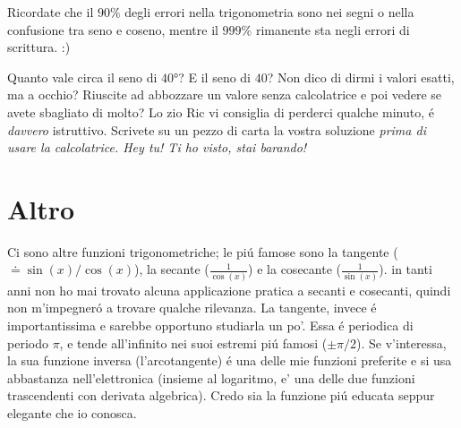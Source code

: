 Ricordate che il $90\%$ degli errori nella trigonometria sono nei segni o nella confusione tra seno e coseno, mentre il $999\%$ rimanente sta negli errori di scrittura. :)

\begin{esercizio}
Quanto vale circa il seno di $\ang{40}$? E il seno di $40$? Non dico di dirmi i valori esatti, ma a occhio? Riuscite ad abbozzare un valore senza calcolatrice
e poi vedere se avete sbagliato di molto? Lo zio Ric vi consiglia di perderci qualche minuto, \'e {\em davvero} istruttivo. Scrivete su un pezzo di carta
la vostra soluzione \em{prima} di usare la calcolatrice. \em{Hey tu! Ti ho visto, stai barando!}
\end{esercizio}


\section{Altro}

Ci sono altre funzioni trigonometriche; le pi\'u famose sono la tangente ($\doteq \sin(x)/\cos(x)$),
la secante ($\frac{1}{\cos(x)}$) e la cosecante ($\frac{1}{\sin(x)}$). in tanti anni non ho mai trovato alcuna applicazione
pratica a secanti e cosecanti, quindi non m'impegner\'o a trovare qualche rilevanza.
La tangente, invece \'e importantissima e sarebbe opportuno studiarla un po'. Essa \'e periodica di periodo $\pi$, e
tende all'infinito nei suoi estremi pi\'u famosi ($\pm \pi/2$). Se v'interessa, la sua funzione inversa (l'arcotangente)
\'e una delle mie funzioni preferite e si usa abbastanza nell'elettronica (insieme al logaritmo, e' una delle due funzioni trascendenti con derivata algebrica).
Credo sia la funzione pi\'u educata seppur elegante che io conosca.
